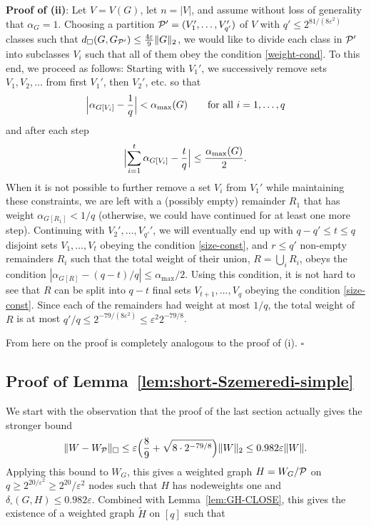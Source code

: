 \documentclass[12pt]{article}
\numberwithin{equation}{section}
\def\eps{\varepsilon}
\def\PP{{\cal P}}\def\QQ{{\cal Q}}\def\RR{{\cal R}}
\begin{document}
{\bf Proof of  (ii)}: Let $V=V(G)$, let $n=|V|$, and assume
without loss of generality that $\alpha_G=1$. Choosing a partition
$\PP'=(V_1',\dots,V_{q'}')$ of $V$ with $q'\leq 2^{81/(8\eps^2)}$
classes such that $d_\square(G,G_{\PP'})\leq \frac {4\eps}9\|G\|_{2}
$, we would like to divide each class in $\PP'$ into subclasses
$V_i$ such that all of them obey the condition \eqref{weight-cond}.
To this end, we proceed as follows:  Starting with $V_1'$, we
successively remove sets $V_1,V_2,\dots$ from first $V_1'$, then
$V_2'$, etc. so that
\begin{equation}
\label{size-const}
\Bigl|\alpha_{G[V_i]}-\frac {1}q\Bigr|
<\alpha_{\max}(G)
\qquad\text{for all $i=1,\dots,q$}
\end{equation}
and after each step
\[
\Bigl|\sum_{i=1}^t \alpha_{G[V_i]}
-\frac{t}q\Bigr|\leq \frac{\alpha_{\max}(G)}2.
\]
When it is not possible to further remove a set $V_i$ from $V_1'$
while maintaining these constraints, we are left with a (possibly
empty) remainder $R_1$ that has weight $\alpha_{G[R_1]}<1/q$
(otherwise, we could have continued for at least one more step).
Continuing with $V_2',\dots,V_{q'}'$, we will eventually end up with
$q-q'\leq t\leq q$ disjoint sets $V_1,\dots, V_t$ obeying the
condition \eqref{size-const}, and $r\leq q'$ non-empty remainders
$R_i$ such that the total weight of their union, $R=\bigcup_iR_i$,
obeys the condition $|\alpha_{G[R]}-(q-t)/q|\leq \alpha_{\max}/2$.
Using this condition, it is not hard to see that $R$ can be split
into $q-t$ final sets $V_{t+1},\dots, V_q$ obeying the condition
\eqref{size-const}. Since each of the remainders  had weight at most
$1/q$, the total weight of $R$ is at most $q'/q\leq
2^{-79/(8\eps^2)}\leq \eps^2 2^{-79/8}$.

From here on the proof is completely analogous to the  proof of
(i).  \hfill$\square$

\subsection{Proof of Lemma~\ref{lem:short-Szemeredi-simple}}

We start with the observation that the proof of the last
section actually gives the stronger bound
\[
\|W-W_\PP\|_\square\leq
\eps\Bigl(\frac 89 + \sqrt{8\cdot 2^{-79/8}}\Bigr)\|W\|_2
\leq 0.982\eps\|W\|.
\]
Applying this bound to $W_G$, this gives a weighted
graph $H=W_G/\PP$ on $q\geq 2^{20/\eps^2}\geq 2^{20}/\eps^2$ nodes
such that $H$ has nodeweights one and
$\delta_\square(G,H)\leq 0.982\eps$.
Combined with Lemma~\ref{lem:GH-CLOSE}, this gives the existence of a weighted
graph $\widetilde H$ on $[q]$ such that
\end{document}
